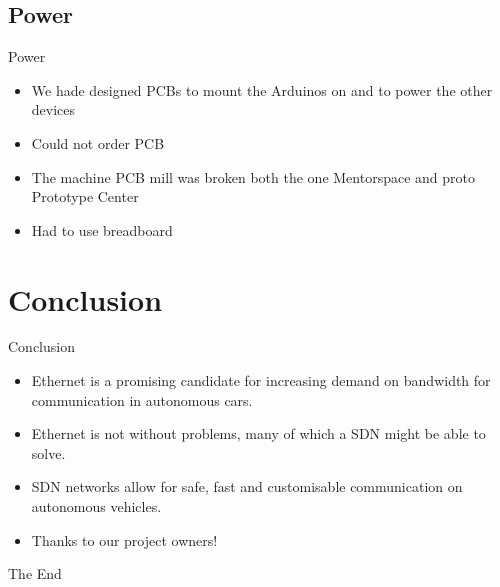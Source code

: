 \documentclass{beamer}
\begin{document}
\subsection{Power}
\begin{frame}{Power}
    \begin{itemize}
        \item We hade designed PCBs to mount the Arduinos on and to power the other devices
        \item Could not order PCB
        \item The machine PCB mill was broken both the one Mentorspace and proto Prototype Center
        \item Had to use breadboard 
    \end{itemize}
\end{frame}







\section{Conclusion}
\begin{frame}{Conclusion}
    \begin{itemize}
        \item Ethernet is a promising candidate for increasing demand on bandwidth for communication in autonomous cars.
        \item Ethernet is not without problems, many of which a SDN might be able to solve.
        \item SDN networks allow for safe, fast and customisable communication on autonomous vehicles.
        \item Thanks to our project owners! 
    \end{itemize}
    
\end{frame}






\begin{frame}
\Huge{\centerline{The End}}
\end{frame}

\end{document}
